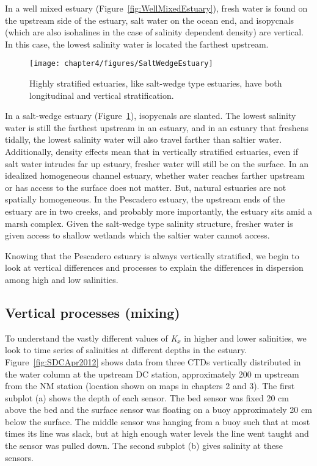 In a well mixed estuary (Figure~\ref{fig:WellMixedEstuary}), fresh water is found on the upstream side of the estuary, salt water on the ocean end, and isopycnals (which are also isohalines in the case of salinity dependent density) are vertical. In this case, the lowest salinity water is located the farthest upstream. 

\begin{figure}[h]
\centering
	\texttt{[image: chapter4/figures/SaltWedgeEstuary]}
	\caption{Highly stratified estuaries, like salt-wedge type estuaries, have both longitudinal and vertical stratification.} \label{fig:SaltWedgeEstuary}
\end{figure}

In a salt-wedge estuary (Figure~\ref{fig:SaltWedgeEstuary}), isopycnals are slanted. The lowest salinity water is still the farthest upstream in an estuary, and in an estuary that freshens tidally, the lowest salinity water will also travel farther than saltier water. Additionally, density effects mean that in vertically stratified estuaries, even if salt water intrudes far up estuary, fresher water will still be on the surface. In an idealized homogeneous channel estuary, whether water reaches farther upstream or has access to the surface does not matter. But, natural estuaries are not spatially homogeneous. In the Pescadero estuary, the upstream ends of the estuary are in two creeks, and probably more importantly, the estuary sits amid a marsh complex. Given the salt-wedge type salinity structure, fresher water is given access to shallow wetlands which the saltier water cannot access. 

Knowing that the Pescadero estuary is always vertically stratified, we begin to look at vertical differences and processes to explain the differences in dispersion among high and low salinities. 

\subsection{Vertical processes (mixing)}

To understand the vastly different values of \emph{K$_x$} in higher and lower salinities, we look to time series of salinities at different depths in the estuary. Figure~\ref{fig:SDCApr2012} shows data from three CTDs vertically distributed in the water column at the upstream DC station, approximately 200 m upstream from the NM station (location shown on maps in chapters 2 and 3). The first subplot (a) shows the depth of each sensor. The bed sensor was fixed 20 cm above the bed and the surface sensor was floating on a buoy approximately 20 cm below the surface. The middle sensor was hanging from a buoy such that at most times its line was slack, but at high enough water levels the line went taught and the sensor was pulled down. The second subplot (b) gives salinity at these sensors.

